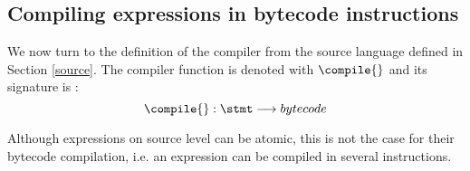 

\subsection{Compiling expressions in bytecode instructions} \label{compExpr}
We now turn to the definition of the compiler from the source language defined in Section \ref{source}.
The compiler function is denoted with $\compile{}$ and its signature is :
$$ \compile{ } : \stmt \longrightarrow bytecode $$

 Although expressions on source level can be atomic, this is not the case for their bytecode compilation, i.e.
an expression can be compiled in several instructions.

